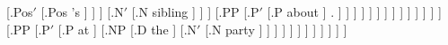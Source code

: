 \documentclass{article}
\begin{document}
\begin{landscape}
{                                                                                    [.Pos$'$ [.{Pos\degree\textsubscript{\rbrack}} {'s} ] ] ]
                                                                             [.N$'$ [.{N\degree\textsubscript{\rbrack}} sibling ] ] ]
                                                                        [.PP [.P$'$ [.{P\degree} about ]
                                                                                    {.} ] ] ] ] ] ] ] ] ] ] ] ] ] ]
                                                     [.PP [.P$'$ [.{P\degree} at ]
                                                                 [.NP [.{D\textsubscript{\rbrack}} the ]
                                                                      [.N$'$ [.{N\degree\textsubscript{\rbrack}} party ] ] ] ] ] ] ] ] ] ] ] ]
}

\end{landscape}
\end{document}
